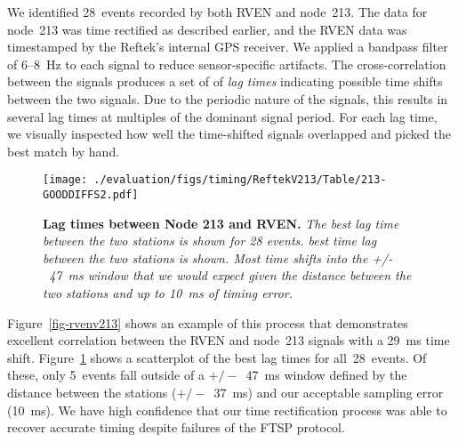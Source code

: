 We identified 28~events recorded by both RVEN and node~213.  The data for
node~213 was time rectified as described earlier, and the RVEN data was
timestamped by the Reftek's internal GPS receiver.  We applied a bandpass
filter of 6--8~Hz to each signal to reduce sensor-specific artifacts. The
cross-correlation between the signals produces a set of
of {\em lag times} indicating possible time shifts between the two signals.
Due to the periodic nature of the signals, this results in
several lag times at multiples of the dominant signal period. For each lag
time, we visually inspected how well the time-shifted signals overlapped and
picked the best match by hand.


\begin{figure}[t]
\begin{center}
\texttt{[image: ./evaluation/figs/timing/ReftekV213/Table/213-GOODDIFFS2.pdf]}
\end{center}
\caption{\small{\bf Lag times between Node 213 and RVEN.}
{\em The best lag time between the two stations is shown for 28 events.  best
time lag between the two stations is shown.  Most time shifts into the
+/-~47~ms window that we would expect given the distance between the two
stations and up to 10~ms of timing error.}}
\label{fig-rvenv213all}
\end{figure}

Figure~\ref{fig-rvenv213} shows an example of this process that demonstrates
excellent correlation between the RVEN and node~213 signals with a 29~ms time
shift. Figure~\ref{fig-rvenv213all} shows a scatterplot of the best lag times
for all~28~events.  Of these, only 5~events fall outside of a $+/-$~47~ms
window defined by the distance between the stations ($+/-$~37~ms) and our
acceptable sampling error (10~ms). We have high confidence that our
time rectification process was able to recover accurate timing despite
failures of the FTSP protocol.


